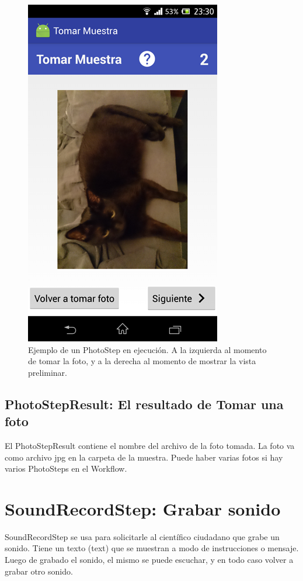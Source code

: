 \begin{figure}[H]
    \includegraphics[scale=0.4]{05-implementacion/PhotoStep2.png}     
   \caption{Ejemplo de un PhotoStep en ejecución. A la izquierda al momento de tomar la foto, y a la derecha al momento de mostrar la vista preliminar.}
   \label{fig:imgPhotoStep}
\end{figure}

\subsection{PhotoStepResult: El resultado de Tomar una foto}
El PhotoStepResult contiene el nombre del archivo de la foto tomada. La foto va como archivo jpg en la carpeta de la muestra.
Puede haber varias fotos si hay varios PhotoSteps en el Workflow.




\section{SoundRecordStep: Grabar sonido}
SoundRecordStep  se usa para solicitarle al científico ciudadano que grabe un sonido. Tiene un texto (text) que se muestran a modo de instrucciones o mensaje. Luego de grabado el sonido, el mismo se puede escuchar, y en todo caso volver a grabar otro sonido.


